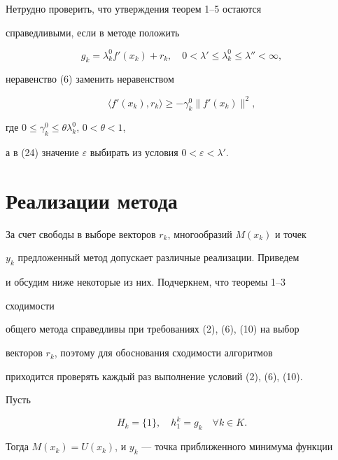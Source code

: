 Нетрудно проверить, что утверждения теорем 1--5 остаются 


справедливыми, если в методе положить


$$


g_k=\lambda^0_k{f}'(x_k)+r_k,\quad 0<{\lambda }'\leq \lambda^0_k


\leq {\lambda }''<\infty,


$$


неравенство (6) заменить неравенством


$$


\langle {{f}'(x_k),r_k } \rangle  \geq -\gamma^0_k\| {{f}'(x_k) } \|^2,


$$


где $0\leq \gamma^0_k\leq \theta \lambda^0_k$, $0<\theta <1$,


а в (24) значение $\varepsilon $ выбирать из условия $0<\varepsilon <


{\lambda }'$. 





\section{Реализации метода}





За счет свободы в выборе векторов $r_k$, многообразий $M(x_k)$ и точек


$y_k$ предложенный метод допускает различные реализации. Приведем


и обсудим ниже некоторые из них. Подчеркнем, что теоремы 1--3 


сходимости


общего метода справедливы при требованиях (2), (6), (10) на выбор


векторов $r_k$, поэтому для обоснования сходимости алгоритмов 


приходится проверять каждый раз выполнение условий (2), (6), (10).





Пусть


\begin{equation}


H_k=\{1\},\quad h^k_1=g_k\quad \forall k\in K.


\end{equation}


Тогда $M(x_k)=U(x_k)$, и $y_k$ --- точка приближенного минимума функции 


